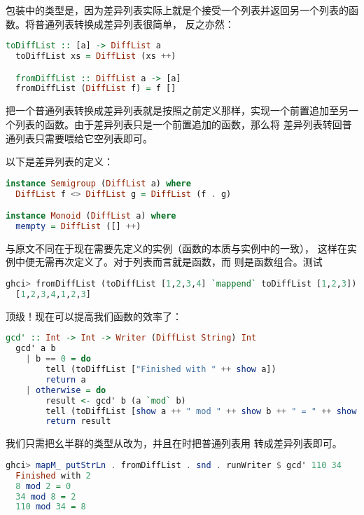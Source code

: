 \documentclass[./main.tex]{subfiles}
\begin{document}
包装中的类型是\acode{[a] -> [a]}，因为差异列表实际上就是个接受一个列表并返回另一个列表的函数。将普通列表转换成差异列表很简单，
反之亦然：

\begin{lstlisting}[language=Haskell]
  toDiffList :: [a] -> DiffList a
  toDiffList xs = DiffList (xs ++)

  fromDiffList :: DiffList a -> [a]
  fromDiffList (DiffList f) = f []
\end{lstlisting}

把一个普通列表转换成差异列表就是按照之前定义那样，实现一个前置追加至另一个列表的函数。由于差异列表只是一个前置追加的函数，那么将
差异列表转回普通列表只需要喂给它空列表即可。

以下是差异列表的定义：

\begin{lstlisting}[language=Haskell]
instance Semigroup (DiffList a) where
  DiffList f <> DiffList g = DiffList (f . g)

instance Monoid (DiffList a) where
  mempty = DiffList ([] ++)
\end{lstlisting}

与原文不同在于现在需要先定义的实例（\acode{<>}函数的本质与实例中的一致），
这样在实例中便无需再次定义了。对于列表而言就是函数，而
则是函数组合。测试

\begin{lstlisting}[language=Haskell]
  ghci> fromDiffList (toDiffList [1,2,3,4] `mappend` toDiffList [1,2,3])
  [1,2,3,4,1,2,3]
\end{lstlisting}

顶级！现在可以提高我们函数的效率了：

\begin{lstlisting}[language=Haskell]
  gcd' :: Int -> Int -> Writer (DiffList String) Int
  gcd' a b
    | b == 0 = do
        tell (toDiffList ["Finished with " ++ show a])
        return a
    | otherwise = do
        result <- gcd' b (a `mod` b)
        tell (toDiffList [show a ++ " mod " ++ show b ++ " = " ++ show (a `mod` b)])
        return result
\end{lstlisting}

我们只需把幺半群的类型从\acode{[String]}改为，并且在时把普通列表用
转成差异列表即可。

\begin{lstlisting}[language=Haskell]
  ghci> mapM_ putStrLn . fromDiffList . snd . runWriter $ gcd' 110 34
  Finished with 2
  8 mod 2 = 0
  34 mod 8 = 2
  110 mod 34 = 8
\end{lstlisting}
\end{document}
